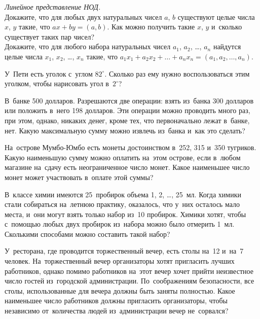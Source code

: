 


\begin{problems}

\item\emph{Линейное представление НОД.}
\\
\subproblem
Докажите, что для любых двух натуральных чисел $a$, $b$ существуют целые числа
$x$, $y$ такие, что $a x + b y = (a, b)$.
Как можно получить такие $x$, $y$ и~сколько существует таких пар чисел?
\\
\subproblem
Докажите, что для любого набора натуральных чисел
$a_{1}$, $a_{2}$, \ldots, $a_{n}$
найдутся целые числа $x_{1}$, $x_{2}$, \ldots, $x_{n}$ такие, что
\(
    a_{1} x_{1} + a_{2} x_{2} + \ldots + a_{n} x_{n}
=
    (a_{1}, a_{2}, \ldots, a_{n})
\).

\item
У~Пети есть уголок с~углом $82^{\circ}$.
Сколько раз ему нужно воспользоваться этим уголком, чтобы нарисовать угол
в~$2^{\circ}$?

\item
В~банке 500 долларов.
Разрешаются две операции: взять из~банка 300 долларов или положить в~него
198 долларов.
Эти операции можно проводить много раз, при этом, однако, никаких денег, кроме
тех, что первоначально лежат в~банке, нет.
Какую максимальную сумму можно извлечь из~банка и~как это сделать?

\item
На~острове Мумбо-Юмбо есть монеты достоинством в~252, 315 и~350 тугриков.
Какую наименьшую сумму можно оплатить на~этом острове, если в~любом магазине
на~сдачу есть неограниченное число монет.
Какое наименьшее число монет может участвовать в~оплате этой суммы?

\item
В~классе химии имеются 25~пробирок объема 1, 2, \ldots, 25~мл.
Когда химики стали собираться на~летнюю практику, оказалось, что у~них осталось
мало места, и~они могут взять только набор из~10 пробирок.
Химики хотят, чтобы с~помощью любых двух пробирок из~набора можно было отмерить
1~мл.
Сколькими способами можно составить такой набор?

\item
У~ресторана, где проводится торжественный вечер, есть столы на~12
и~на~7 человек.
На~торжественный вечер организаторы хотят пригласить лучших работников, однако
помимо работников на~этот вечер хочет прийти неизвестное число гостей
из~городской администрации.
По~соображениям безопасности, все столы, использованные для вечера должны быть
заняты полностью.
Какое наименьшее число работников должны пригласить организаторы, чтобы
независимо от~количества людей из~администрации вечер не~сорвался?


\end{problems}
